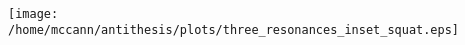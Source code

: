 \documentclass[12pt]{article}
\begin{document}
\mbox{ }
\vfill
\begin{center}
  \texttt{[image: /home/mccann/antithesis/plots/three\_resonances\_inset\_squat.eps]}
\end{center}
\vfill
\mbox{ }
\end{document}
